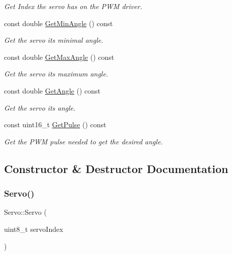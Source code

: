 \begin{DoxyCompactItemize}
\begin{DoxyCompactList}\small\item\em Get Index the servo has on the P\+WM driver. \end{DoxyCompactList}\item 
const double \mbox{\hyperlink{classServo_ad534074ab9d9e72415d237510e559af5}{Get\+Min\+Angle}} () const
\begin{DoxyCompactList}\small\item\em Get the servo its minimal angle. \end{DoxyCompactList}\item 
const double \mbox{\hyperlink{classServo_a4f78f0ed210d9881b1f87c63a7a680a0}{Get\+Max\+Angle}} () const
\begin{DoxyCompactList}\small\item\em Get the servo its maximum angle. \end{DoxyCompactList}\item 
const double \mbox{\hyperlink{classServo_a1fd54cfd8f26d6d94211db5d9250b042}{Get\+Angle}} () const
\begin{DoxyCompactList}\small\item\em Get the servo its angle. \end{DoxyCompactList}\item 
const uint16\+\_\+t \mbox{\hyperlink{classServo_addcbaf416b54f183d24d6139f20f0312}{Get\+Pulse}} () const
\begin{DoxyCompactList}\small\item\em Get the P\+WM pulse needed to get the desired angle. \end{DoxyCompactList}\end{DoxyCompactItemize}


\subsection{Constructor \& Destructor Documentation}
\mbox{\label{classServo_a3923a1b16b5a158d57307f364de4627e}} 
\subsubsection{\texorpdfstring{Servo()}{Servo()}\hspace{0.1cm}{\footnotesize\ttfamily [1/4]}}
{\footnotesize\ttfamily Servo\+::\+Servo (\begin{DoxyParamCaption}\item[{uint8\+\_\+t}]{servo\+Index }\end{DoxyParamCaption})}



